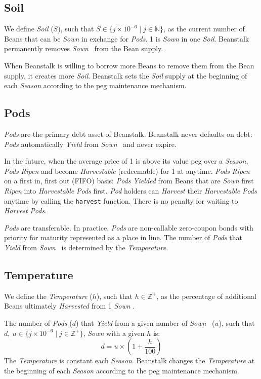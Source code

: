 \documentclass[tikz]{article}
\newcommand{\code}[1]{\texttt{#1}}
\newcommand{\term}[1]{\textsl{#1}}
\newcommand{\Bean}{} %
\begin{document}
\subsection{Soil}
We define \term{Soil} ($S$), such that $S \in \{j \times 10^{-6} \mid j \in \mathbb{N} \}$, as the current number of Beans that can be \term{Sown} in exchange for \term{Pods}. \Bean1 is \term{Sown} in one \term{Soil}. Beanstalk permanently removes \term{Sown} \Bean\ from the Bean supply. 

When Beanstalk is willing to borrow more Beans to remove them from the Bean supply, it creates more \term{Soil}. Beanstalk sets the \term{Soil} supply at the beginning of each \term{Season} according to the peg maintenance mechanism.

\subsection{Pods}
\term{Pods} are the primary debt asset of Beanstalk. Beanstalk never defaults on debt: \term{Pods} automatically \term{Yield} from \term{Sown} \Bean\ and never expire.

In the future, when the average price of \Bean1 is above its value peg over a \term{Season}, \term{Pods} \term{Ripen} and become \term{Harvestable} (redeemable) for \Bean1 at anytime. \term{Pods} \term{Ripen} on a first in, first out (FIFO) basis: \term{Pods} \term{Yielded} from Beans that are \term{Sown} first \term{Ripen} into \term{Harvestable} \term{Pods} first. \term{Pod} holders can \term{Harvest} their \term{Harvestable} \term{Pods} anytime by calling the \code{harvest} function. There is no penalty for waiting to \term{Harvest} \term{Pods}.

\term{Pods} are transferable. In practice, \term{Pods} are non-callable zero-coupon bonds with priority for maturity represented as a place in line. The number of \term{Pods} that \term{Yield} from \term{Sown} \Bean\ is determined by the \term{Temperature}.

\subsection{Temperature}
We define the \term{Temperature} ($h$), such that $h \in \mathbb{Z}^{+}$, as the percentage of additional Beans ultimately \term{Harvested} from 1 \term{Sown} \Bean. 

The number of \term{Pods} ($d$) that \term{Yield} from a given number of \term{Sown} \Bean\ ($u$), such that $d,\ u \in \{j \times 10^{-6} \mid j \in \mathbb{Z}^{+} \}$, \term{Sown} with a given $h$ is:
$$d = u \times \left(1 + \frac{h}{100}\right)$$
The \term{Temperature} is constant each \term{Season}. Beanstalk changes the \term{Temperature} at the beginning of each \term{Season} according to the peg maintenance mechanism.
\end{document}
